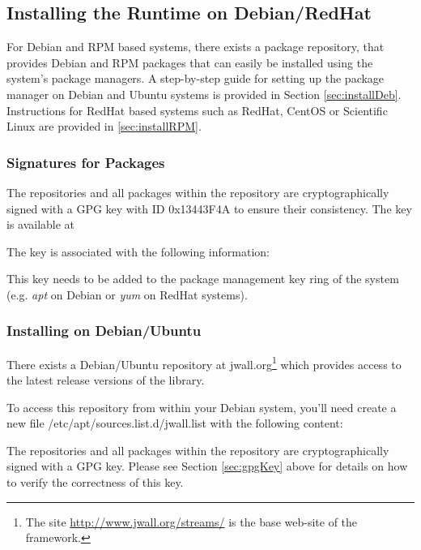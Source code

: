 
\subsection{Installing the \streams Runtime on Debian/RedHat}
For Debian and RPM based systems, there exists a package repository,
that provides Debian and RPM packages that can easily be installed
using the system's package managers. A step-by-step guide for setting
up the package manager on Debian and Ubuntu systems is provided in
Section \ref{sec:installDeb}. Instructions for RedHat based systems
such as RedHat, CentOS or Scientific Linux are provided in
\ref{sec:installRPM}.


\subsubsection{\label{sec:gpgKey}Signatures for Packages}
The repositories and all packages within the repository are
cryptographically signed with a GPG key with ID {\ttfamily 0x13443F4A}
to ensure their consistency. The key is available at


The key is associated with the following information:


This key needs to be added to the package management key ring of the
system (e.g. {\em apt} on Debian or {\em yum} on RedHat systems).

\subsubsection{\label{sec:installDeb}Installing on Debian/Ubuntu}
There exists a Debian/Ubuntu repository at {\ttfamily
  jwall.org}\footnote{The site \url{http://www.jwall.org/streams/} is
  the base web-site of the \streams framework.} which provides access
to the latest release versions of the \streams library.

To access this repository from within your Debian system, you'll need
create a new file {\ttfamily /etc/apt/sources.list.d/jwall.list} with
the following content:


The repositories and all packages within the repository are
cryptographically signed with a GPG key. Please see Section
\ref{sec:gpgKey} above for details on how to verify the correctness of
this key.

